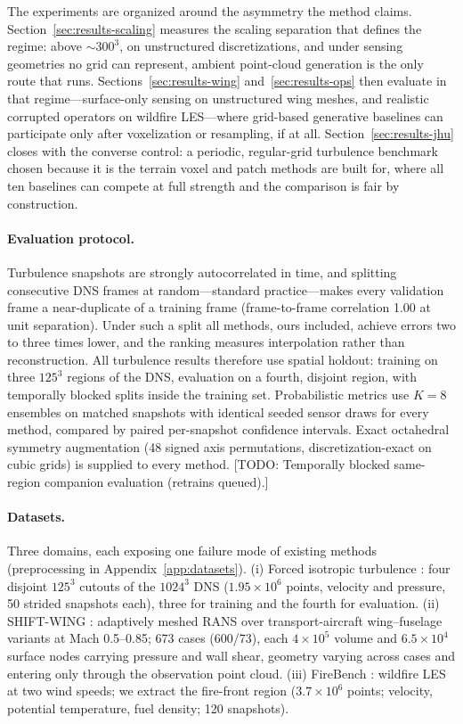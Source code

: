 \documentclass{article} %
\newcommand{\todo}[1]{{\color{red}[TODO: #1]}}
\begin{document}
The experiments are organized around the asymmetry the method claims. Section~\ref{sec:results-scaling} measures the scaling separation that defines the regime: above $\sim$$300^3$, on unstructured discretizations, and under sensing geometries no grid can represent, ambient point-cloud generation is the only route that runs. Sections~\ref{sec:results-wing} and~\ref{sec:results-ops} then evaluate in that regime---surface-only sensing on unstructured wing meshes, and realistic corrupted operators on wildfire LES---where grid-based generative baselines can participate only after voxelization or resampling, if at all. Section~\ref{sec:results-jhu} closes with the converse control: a periodic, regular-grid turbulence benchmark chosen because it is the terrain voxel and patch methods are built for, where all ten baselines can compete at full strength and the comparison is fair by construction.

\paragraph{Evaluation protocol.}
Turbulence snapshots are strongly autocorrelated in time, and splitting consecutive DNS frames at random---standard practice---makes every validation frame a near-duplicate of a training frame (frame-to-frame correlation 1.00 at unit separation). Under such a split all methods, ours included, achieve errors two to three times lower, and the ranking measures interpolation rather than reconstruction. All turbulence results therefore use spatial holdout: training on three $125^3$ regions of the DNS, evaluation on a fourth, disjoint region, with temporally blocked splits inside the training set. Probabilistic metrics use $K{=}8$ ensembles on matched snapshots with identical seeded sensor draws for every method, compared by paired per-snapshot confidence intervals. Exact octahedral symmetry augmentation (48 signed axis permutations, discretization-exact on cubic grids) is supplied to every method. \todo{Temporally blocked same-region companion evaluation (retrains queued).}

\paragraph{Datasets.}
Three domains, each exposing one failure mode of existing methods (preprocessing in Appendix~\ref{app:datasets}). (i) Forced isotropic turbulence \citep{li2008public}: four disjoint $125^3$ cutouts of the $1024^3$ DNS ($1.95\times10^{6}$ points, velocity and pressure, 50 strided snapshots each), three for training and the fourth for evaluation. (ii) SHIFT-WING \citep{luminary2026shiftwing}: adaptively meshed RANS over transport-aircraft wing--fuselage variants at Mach 0.5--0.85; 673 cases (600/73), each $4\times10^{5}$ volume and $6.5\times10^{4}$ surface nodes carrying pressure and wall shear, geometry varying across cases and entering only through the observation point cloud. (iii) FireBench \citep{firebench2024}: wildfire LES at two wind speeds; we extract the fire-front region ($3.7\times10^{6}$ points; velocity, potential temperature, fuel density; 120 snapshots).
\end{document}
